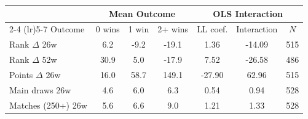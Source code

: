\begin{tabular}{l ccc ccc}
\toprule
 & \multicolumn{3}{c}{Mean Outcome} & \multicolumn{3}{c}{OLS Interaction} \\
\cmidrule(lr){2-4} \cmidrule(lr){5-7}
Outcome & 0 wins & 1 win & 2+ wins & LL coef. & Interaction & $N$ \\
\midrule
Rank $\Delta$ 26w & 6.2 & -9.2 & -19.1 & 1.36 & -14.09 & 515 \\
Rank $\Delta$ 52w & 30.9 & 5.0 & -17.9 & 7.52 & -26.58 & 486 \\
Points $\Delta$ 26w & 16.0 & 58.7 & 149.1 & -27.90 & 62.96 & 515 \\
Main draws 26w & 4.6 & 6.0 & 6.3 & 0.54 & 0.94 & 528 \\
Matches (250+) 26w & 5.6 & 6.6 & 9.0 & 1.21 & 1.33 & 528 \\
\bottomrule
\end{tabular}
